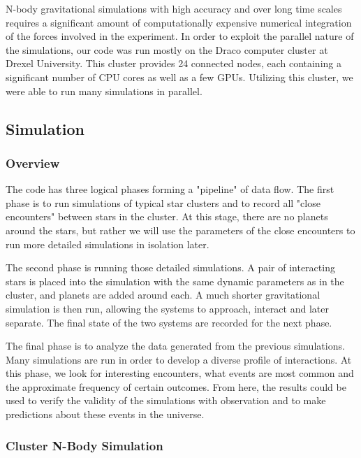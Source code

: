 \documentclass[12pt]{article}
\begin{document}
    N-body gravitational simulations with high accuracy and over long time scales requires
    a significant amount of computationally expensive numerical integration of the 
    forces involved in the experiment. In order to exploit the parallel nature of 
    the simulations, our code was run mostly on the Draco computer 
    cluster at Drexel University. This cluster provides 24 connected nodes, each containing
    a significant number of CPU cores as well as a few GPUs. Utilizing this cluster,
    we were able to run many simulations in parallel.

    \subsection{Simulation}

    \subsubsection{Overview}

    The code has three logical phases forming a "pipeline" of data flow. 
    The first phase is to run simulations of typical
    star clusters and to record all "close encounters" between stars in the cluster.
    At this stage, there are no planets around the stars, but rather we will use the
    parameters of the close encounters to run more detailed simulations in isolation
    later.

    The second phase is running those detailed simulations. A pair of interacting stars
    is placed into the simulation with the same dynamic parameters as in the cluster,
    and planets are added around each. A much shorter gravitational simulation is then
    run, allowing the systems to approach, interact and later separate. The final
    state of the two systems are recorded for the next phase.

    The final phase is to analyze the data generated from the previous simulations.
    Many simulations are run in order to develop a diverse profile of interactions.
    At this phase, we look for interesting encounters, what events are most common
    and the approximate frequency of certain outcomes. From here, the results could
    be used to verify the validity of the simulations with observation and to make
    predictions about these events in the universe.


    \subsubsection{Cluster N-Body Simulation}
\end{document}
